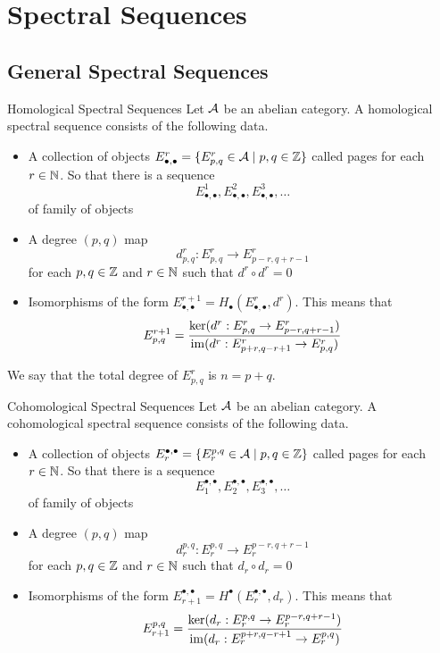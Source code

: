 \documentclass[a4paper]{article}
\begin{document}
\pagebreak
\section{Spectral Sequences}
\subsection{General Spectral Sequences}
\begin{defn}{Homological Spectral Sequences}{} Let $\mathcal{A}$ be an abelian category. A homological spectral sequence consists of the following data.  
\begin{itemize}
\item A collection of objects $E_{\bullet,\bullet}^r=\{E_{p,q}^r\in\mathcal{A}\;|\;p,q\in\mathbb{Z}\}$ called pages for each $r\in\mathbb{N}$. So that there is a sequence $$E_{\bullet,\bullet}^1,E_{\bullet,\bullet}^2,E_{\bullet,\bullet}^3,\dots$$ of family of objects
\item A degree $(p,q)$ map $$d_{p,q}^r:E_{p,q}^r\to E_{p-r,q+r-1}^r$$ for each $p,q\in\mathbb{Z}$ and $r\in\mathbb{N}$ such that $d^r\circ d^r=0$
\item Isomorphisms of the form $E_{\bullet,\bullet}^{r+1}=H_\bullet(E_{\bullet,\bullet}^r,d^r)$. This means that $$E_{p,q}^{r+1}=\frac{\ker(d^r:E_{p,q}^r\to E_{p-r,q+r-1}^r)}{\operatorname{im}(d^r:E_{p+r,q-r+1}^r\to E_{p,q}^r)}$$
\end{itemize}
We say that the total degree of $E_{p,q}^r$ is $n=p+q$. 
\end{defn}

\begin{defn}{Cohomological Spectral Sequences}{} Let $\mathcal{A}$ be an abelian category. A cohomological spectral sequence consists of the following data.  
\begin{itemize}
\item A collection of objects $E_r^{\bullet,\bullet}=\{E_r^{p,q}\in\mathcal{A}\;|\;p,q\in\mathbb{Z}\}$ called pages for each $r\in\mathbb{N}$. So that there is a sequence $$E_1^{\bullet,\bullet},E_2^{\bullet,\bullet},E_3^{\bullet,\bullet},\dots$$ of family of objects
\item A degree $(p,q)$ map $$d_r^{p,q}:E_r^{p,q}\to E_r^{p-r,q+r-1}$$ for each $p,q\in\mathbb{Z}$ and $r\in\mathbb{N}$ such that $d_r\circ d_r=0$
\item Isomorphisms of the form $E_{r+1}^{\bullet,\bullet}=H^\bullet(E_r^{\bullet,\bullet},d_r)$. This means that $$E_{r+1}^{p,q}=\frac{\ker(d_r:E_r^{p,q}\to E_r^{p-r,q+r-1})}{\operatorname{im}(d_r:E_r^{p+r,q-r+1}\to E_r^{p,q})}$$
\end{itemize}
\end{defn}
\end{document}
